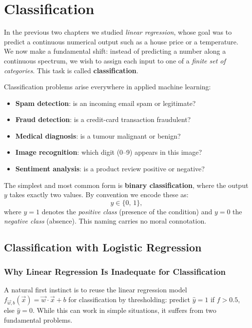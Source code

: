 \chapter{Classification}

In the previous two chapters we studied \emph{linear regression}, whose goal
was to predict a continuous numerical output such as a house price or a
temperature. We now make a fundamental shift: instead of predicting a number
along a continuous spectrum, we wish to assign each input to one of a
\emph{finite set of categories}. This task is called \textbf{classification}.

Classification problems arise everywhere in applied machine learning:
\begin{itemize}
\item \textbf{Spam detection}: is an incoming email spam or legitimate?
\item \textbf{Fraud detection}: is a credit-card transaction fraudulent?
\item \textbf{Medical diagnosis}: is a tumour malignant or benign?
\item \textbf{Image recognition}: which digit (0--9) appears in this image?
\item \textbf{Sentiment analysis}: is a product review positive or negative?
\end{itemize}

The simplest and most common form is \textbf{binary classification}, where the
output $y$ takes exactly two values. By convention we encode these as:
\[y\in\{0,\,1\},\]
where $y=1$ denotes the \emph{positive class} (presence of the condition) and
$y=0$ the \emph{negative class} (absence). This naming carries no moral
connotation.

\section{Classification with Logistic Regression}
\label{sec:logreg}

\subsection{Why Linear Regression Is Inadequate for Classification}

A natural first instinct is to reuse the linear regression model
$f_{\vec{w},b}(\vec{x})=\vec{w}\cdot\vec{x}+b$ for classification by
thresholding: predict $\hat{y}=1$ if $f>0.5$, else $\hat{y}=0$. While this
can work in simple situations, it suffers from two fundamental problems.

